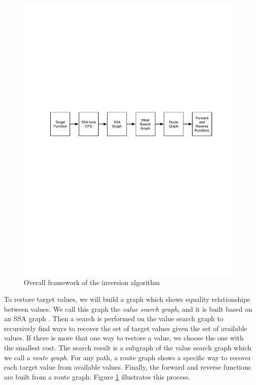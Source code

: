 \documentclass[12pt]{gatech-thesis}
\begin{document}
\begin{figure}
\centering
\includegraphics[width=400pt]{figures1/Framework.pdf}
\caption{Overall framework of the inversion algorithm}
\label{fig:framework}
\end{figure}

To restore target values, we will build a graph which shows equality relationships between values. 
We call this graph the \emph{value search graph}, and it is built based on an SSA graph \cite{Alpern1988,Cooper2001}. 
Then a search is performed on the value search graph to recursively find ways to recover the set of target values given the set of available values. 
If there is more that one way to restore a value, we choose the one with the smallest cost. 
The search result is a subgraph of the value search graph which we call a \emph{route graph}. 
For any path, a route graph shows a specific way to recover each target value from available values. 
Finally, the forward and reverse functions are built from a route graph. 
Figure \ref{fig:framework} illustrates this process.
\end{document}
